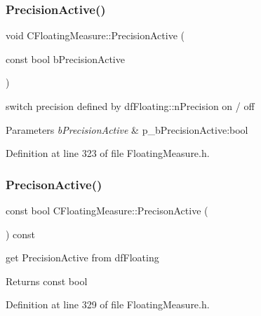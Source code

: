 \subsubsection{\texorpdfstring{Precision\+Active()}{PrecisionActive()}}
{\footnotesize\ttfamily void C\+Floating\+Measure\+::\+Precision\+Active (\begin{DoxyParamCaption}\item[{const bool}]{b\+Precision\+Active }\end{DoxyParamCaption})\hspace{0.3cm}{\ttfamily [inline]}}



switch precision defined by df\+Floating\+::n\+Precision on / off 


\begin{DoxyParams}{Parameters}
{\em b\+Precision\+Active} & p\+\_\+b\+Precision\+Active\+:bool \\
\hline
\end{DoxyParams}


Definition at line 323 of file Floating\+Measure.\+h.

\mbox{\label{classCFloatingMeasure_a90d47ac476295db3c208cb484cd75764}} 
\subsubsection{\texorpdfstring{Precison\+Active()}{PrecisonActive()}}
{\footnotesize\ttfamily const bool C\+Floating\+Measure\+::\+Precison\+Active (\begin{DoxyParamCaption}{ }\end{DoxyParamCaption}) const\hspace{0.3cm}{\ttfamily [inline]}}



get Precision\+Active from df\+Floating 

\begin{DoxyReturn}{Returns}
const bool 
\end{DoxyReturn}


Definition at line 329 of file Floating\+Measure.\+h.

\mbox{\label{classCFloatingMeasure_af4caaa697967a257bc6e13117843ff58}} 

